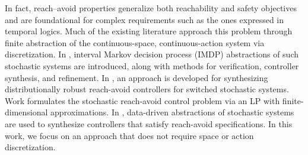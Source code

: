 \documentclass[journal,twoside,web]{ieeecolor}
\newcommand{\rv}[1]{\textcolor{blue}{#1}}
\theoremstyle{definition}
\theoremstyle{plain}
\theoremstyle{plain}
\begin{document}
In fact, reach–avoid properties generalize both reachability and safety objectives \cite{summers2010verification} and are foundational for complex requirements such as the ones expressed in temporal logics.
Much of the existing literature approach this problem through finite abstraction of the continuous-space, continuous-action  system via discretization. In \cite{lahijanian2015formal},  interval Markov decision process (IMDP) abstractions of such stochastic systems are introduced, along with methods for verification, controller synthesis, and refinement. In \cite{gracia2025efficient}, an approach is developed for synthesizing distributionally robust reach-avoid controllers for switched stochastic systems. Work \cite{kariotoglou2017linear} formulates the stochastic reach-avoid control problem via an LP with finite-dimensional approximations. In \cite{coppola2024data}, data-driven abstractions of stochastic systems are used to synthesize controllers that satisfy reach-avoid specifications.
In this work, we focus on an approach that does not require space or action discretization.


\end{document}
